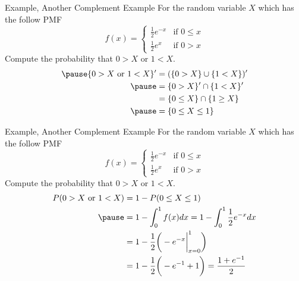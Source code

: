 \documentclass[handout]{beamer}
\newcommand{\nl}[1]{\vspace{#1 em}}
\begin{document}
    \begin{frame}{Example, Another Complement Example}
        For the random variable $X$ which has the follow PMF
        $$f(x)=\begin{cases} \frac{1}{2} e^{-x} & \text{if }0\leq x \\
        \frac{1}{2} e^{x} & \text{if } 0> x \end{cases} $$
        Compute the probability that $0>X$ or $1<X$.
        \\ \nl{0.5}
        \begin{align*}
        \pause \{ 0>X\text{ or } 1<X \}' &=  (\{ 0>X \} \cup \{1<X \})'\\
        \pause & = \{ 0>X \}' \cap \{1<X \}' \\
        & = \{ 0\leq X \} \cap \{1\geq X \} \\
        \pause & = \{ 0\leq X \leq 1\}\\
        \end{align*}
    \end{frame}
    \begin{frame}{Example, Another Complement Example}
        For the random variable $X$ which has the follow PMF
        $$f(x)=\begin{cases} \frac{1}{2} e^{-x} & \text{if }0\leq x \\
        \frac{1}{2} e^{x} & \text{if } 0> x \end{cases} $$
        Compute the probability that $0>X$ or $1<X$.
        \\ \nl{0.5}
        \begin{align*}
            P( 0>X\text{ or } 1<X ) & = 1 - P(0\leq X \leq 1)\\
            \pause & = 1 - \int_{0}^1 f(x)dx = 1 - \int_{0}^1 \frac{1}{2} e^{-x}dx\\
            & = 1 - \frac{1}{2}\bigg( -e^{-x} \bigg|_{x=0}^1 \bigg)\\
            & = 1 - \frac{1}{2}\bigg( -e^{-1} + 1 \bigg) = \frac{1 + e^{-1}}{2}
        \end{align*}
    \end{frame}
\end{document}

